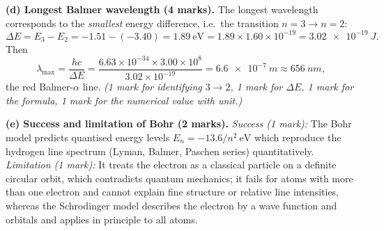 \documentclass[11pt]{article}
\begin{document}
\begin{corrige}
\textbf{(d) Longest Balmer wavelength (4 marks).} The longest wavelength corresponds to the \emph{smallest} energy difference, i.e.\ the transition $n = 3 \to n = 2$:
\[ \Delta E = E_3 - E_2 = -1.51 - (-3.40) = 1.89\ \mathrm{eV} = 1.89 \times 1.60\times 10^{-19} = \SI{3.02e-19}{J}. \]
Then
\[ \lambda_{\max} = \frac{hc}{\Delta E} = \frac{6.63\times 10^{-34} \times 3.00\times 10^{8}}{3.02\times 10^{-19}} = \boxed{\SI{6.6e-7}{m}} \approx \SI{656}{nm}, \]
the red Balmer-$\alpha$ line. \emph{(1 mark for identifying $3 \to 2$, 1 mark for $\Delta E$, 1 mark for the formula, 1 mark for the numerical value with unit.)}

\textbf{(e) Success and limitation of Bohr (2 marks).} \emph{Success (1 mark):} The Bohr model predicts quantised energy levels $E_n = -13.6/n^{2}\ \mathrm{eV}$ which reproduce the hydrogen line spectrum (Lyman, Balmer, Paschen series) quantitatively. \emph{Limitation (1 mark):} It treats the electron as a classical particle on a definite circular orbit, which contradicts quantum mechanics; it fails for atoms with more than one electron and cannot explain fine structure or relative line intensities, whereas the Schrodinger model describes the electron by a wave function and orbitals and applies in principle to all atoms.
\end{corrige}
\end{document}

